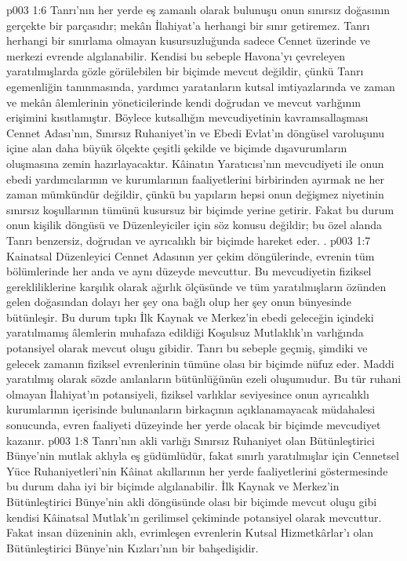 \vs p003 1:6 Tanrı’nın her yerde eş zamanlı olarak bulunuşu onun sınırsız doğasının gerçekte bir parçasıdır; mekân İlahiyat’a herhangi bir sınır getiremez. Tanrı herhangi bir sınırlama olmayan kusursuzluğunda sadece Cennet üzerinde ve merkezi evrende algılanabilir. Kendisi bu sebeple Havona’yı çevreleyen yaratılmışlarda gözle görülebilen bir biçimde mevcut değildir, çünkü Tanrı egemenliğin tanınmasında, yardımcı yaratanların kutsal imtiyazlarında ve zaman ve mekân âlemlerinin yöneticilerinde kendi doğrudan ve mevcut varlığının erişimini kısıtlamıştır. Böylece kutsallığın mevcudiyetinin kavramsallaşması Cennet Adası’nın, Sınırsız Ruhaniyet’in ve Ebedi Evlat’ın döngüsel varoluşunu içine alan daha büyük ölçekte çeşitli şekilde ve biçimde dışavurumların oluşmasına zemin hazırlayacaktır. Kâinatın Yaratıcısı’nın mevcudiyeti ile onun ebedi yardımcılarının ve kurumlarının faaliyetlerini birbirinden ayırmak ne her zaman mümkündür değildir, çünkü bu yapıların hepsi onun değişmez niyetinin sınırsız koşullarının tümünü kusursuz bir biçimde yerine getirir. Fakat bu durum onun kişilik döngüsü ve Düzenleyiciler için söz konusu değildir; bu özel alanda Tanrı benzersiz, doğrudan ve ayrıcalıklı bir biçimde hareket eder. .
\vs p003 1:7 Kainatsal Düzenleyici Cennet Adasının yer çekim döngülerinde, evrenin tüm bölümlerinde her anda ve aynı düzeyde mevcuttur. Bu mevcudiyetin fiziksel gerekliliklerine karşılık olarak ağırlık ölçüsünde ve tüm yaratılmışların özünden gelen doğasından dolayı her şey ona bağlı olup her şey onun bünyesinde bütünleşir. Bu durum tıpkı İlk Kaynak ve Merkez’in ebedi geleceğin içindeki yaratılmamış âlemlerin muhafaza edildiği Koşulsuz Mutlaklık’ın varlığında potansiyel olarak mevcut oluşu gibidir. Tanrı bu sebeple geçmiş, şimdiki ve gelecek zamanın fiziksel evrenlerinin tümüne olası bir biçimde nüfuz eder. Maddi yaratılmış olarak sözde anılanların bütünlüğünün ezeli oluşumudur. Bu tür ruhani olmayan İlahiyat’ın potansiyeli, fiziksel varlıklar seviyesince onun ayrıcalıklı kurumlarının içerisinde bulunanların birkaçının açıklanamayacak müdahalesi sonucunda, evren faaliyeti düzeyinde her yerde olacak bir biçimde mevcudiyet kazanır.
\vs p003 1:8 Tanrı’nın akli varlığı Sınırsız Ruhaniyet olan Bütünleştirici Bünye’nin mutlak aklıyla eş güdümlüdür, fakat sınırlı yaratılmışlar için Cennetsel Yüce Ruhaniyetleri’nin Kâinat akıllarının her yerde faaliyetlerini göstermesinde bu durum daha iyi bir biçimde algılanabilir. İlk Kaynak ve Merkez’in Bütünleştirici Bünye’nin akli döngüsünde olası bir biçimde mevcut oluşu gibi kendisi Kâinatsal Mutlak’ın gerilimsel çekiminde potansiyel olarak mevcuttur. Fakat insan düzeninin aklı, evrimleşen evrenlerin Kutsal Hizmetkârlar’ı olan Bütünleştirici Bünye’nin Kızları’nın bir bahşedişidir.
